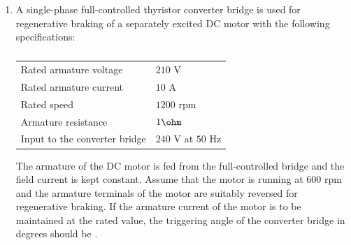 \documentclass[journal,12pt,onecolumn]{IEEEtran}
\theoremstyle{remark}
\begin{document}
\begin{enumerate}[start=1, label=Q.\arabic*]
    \item A single-phase full-controlled thyristor converter bridge is used for regenerative braking of a separately excited DC motor with the following specifications:
    \begin{table}[H]
        \centering
        \caption*{}
        \label{tab:motor_specs}
        \begin{tabular}{|l|l|}
            \hline
            Rated armature voltage & $210$ V \\
            Rated armature current & $10$ A \\
            Rated speed & $1200$ rpm \\
            Armature resistance & $1 \ohm$ \\
            Input to the converter bridge & $240$ V at $50$ Hz \\
            \hline
        \end{tabular}
    \end{table}
    The armature of the DC motor is fed from the full-controlled bridge and the field current is kept constant.
    Assume that the motor is running at $600$ rpm and the armature terminals of the motor are suitably reversed for regenerative braking. If the armature current of the motor is to be maintained at the rated value, the triggering angle of the converter bridge in degrees should be \underline{\hspace{2cm}} .

    \hfill{}
\end{enumerate}
\end{document}
